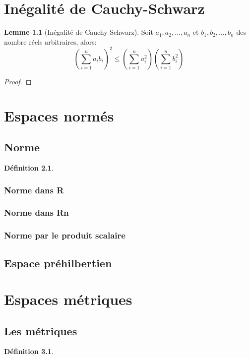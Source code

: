 \documentclass[12pt]{book}
\theoremstyle{definition}
\newtheorem{definition}{Définition}[section]
\newtheorem{lemma}[theorem]{Lemme}
\begin{document}
\chapter{Inégalité de Cauchy-Schwarz}
\begin{lemma}[Inégalité de Cauchy-Schwarz]
    Soit $a_1,a_2,\dots,a_n$ et $b_1,b_2,\dots,b_n$ des nombre réels arbitraires, alors:
    $$ (\sum_{i=1}^{n}a_ib_i)^2 \leq (\sum_{i=1}^{n}a_i^2)(\sum_{i=1}^{n}b_i^2) $$   
\end{lemma}

\begin{proof}
\end{proof}


\chapter{Espaces normés}

\section{Norme}
\begin{definition}
    \label{def:norme}
\end{definition}

\subsection{Norme dans R}

\subsection{Norme dans Rn}

\subsection{Norme par le produit scalaire}

\section{Espace préhilbertien}

\chapter{Espaces métriques}
\section{Les métriques}
\begin{definition}
    \label{def:metrique}
\end{definition}
\end{document}
